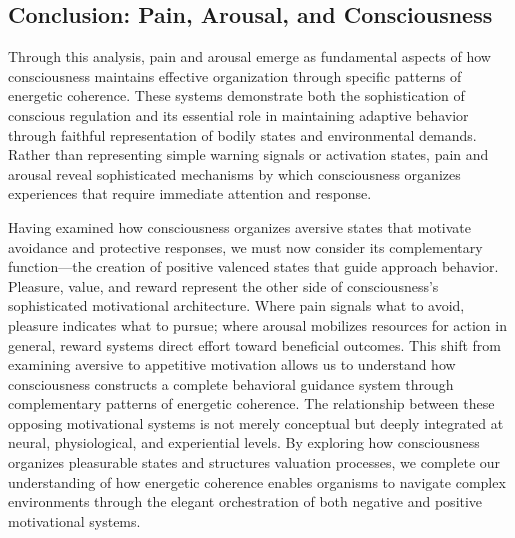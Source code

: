 \subsection*{Conclusion: Pain, Arousal, and Consciousness}

Through this analysis, pain and arousal emerge as fundamental aspects of how consciousness maintains effective organization through specific patterns of energetic coherence. These systems demonstrate both the sophistication of conscious regulation and its essential role in maintaining adaptive behavior through faithful representation of bodily states and environmental demands. Rather than representing simple warning signals or activation states, pain and arousal reveal sophisticated mechanisms by which consciousness organizes experiences that require immediate attention and response.

Having examined how consciousness organizes aversive states that motivate avoidance and protective responses, we must now consider its complementary function—the creation of positive valenced states that guide approach behavior. Pleasure, value, and reward represent the other side of consciousness's sophisticated motivational architecture. Where pain signals what to avoid, pleasure indicates what to pursue; where arousal mobilizes resources for action in general, reward systems direct effort toward beneficial outcomes. This shift from examining aversive to appetitive motivation allows us to understand how consciousness constructs a complete behavioral guidance system through complementary patterns of energetic coherence. The relationship between these opposing motivational systems is not merely conceptual but deeply integrated at neural, physiological, and experiential levels. By exploring how consciousness organizes pleasurable states and structures valuation processes, we complete our understanding of how energetic coherence enables organisms to navigate complex environments through the elegant orchestration of both negative and positive motivational systems.
